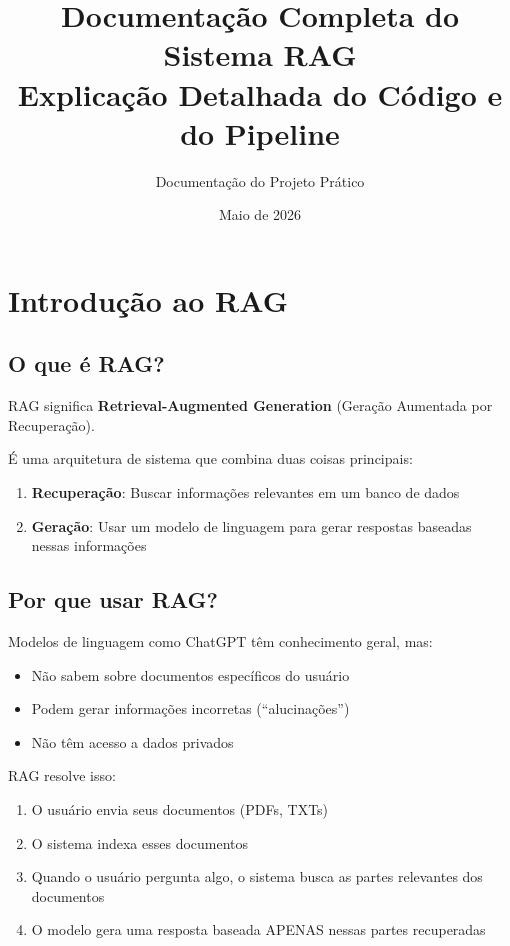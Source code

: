 \documentclass[12pt,a4paper]{article}
\title{\textbf{Documentação Completa do Sistema RAG} \\
        \large Explicação Detalhada do Código e do Pipeline}
\author{Documentação do Projeto Prático}
\date{Maio de 2026}
\begin{document}
\maketitle

\tableofcontents
\newpage

\section{Introdução ao RAG}

\subsection{O que é RAG?}

RAG significa \textbf{Retrieval-Augmented Generation} (Geração Aumentada por Recuperação).

É uma arquitetura de sistema que combina duas coisas principais:

\begin{enumerate}
    \item \textbf{Recuperação}: Buscar informações relevantes em um banco de dados
    \item \textbf{Geração}: Usar um modelo de linguagem para gerar respostas baseadas nessas informações
\end{enumerate}

\subsection{Por que usar RAG?}

Modelos de linguagem como ChatGPT têm conhecimento geral, mas:

\begin{itemize}
    \item Não sabem sobre documentos específicos do usuário
    \item Podem gerar informações incorretas (``alucinações'')
    \item Não têm acesso a dados privados
\end{itemize}

RAG resolve isso:
\begin{enumerate}
    \item O usuário envia seus documentos (PDFs, TXTs)
    \item O sistema indexa esses documentos
    \item Quando o usuário pergunta algo, o sistema busca as partes relevantes dos documentos
    \item O modelo gera uma resposta baseada APENAS nessas partes recuperadas
\end{enumerate}
\end{document}
